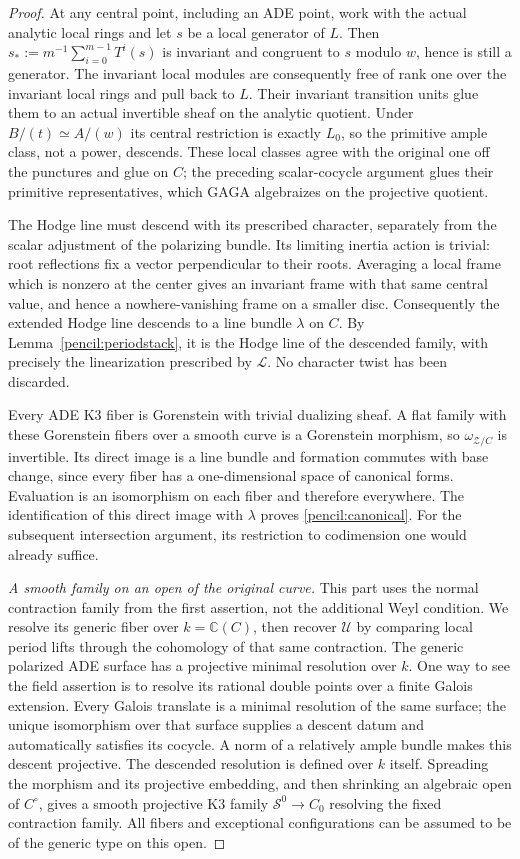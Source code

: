 \documentclass[11pt]{amsart}
\newcommand{\C}{\mathbb C}
\theoremstyle{definition}
\theoremstyle{remark}
\numberwithin{equation}{section}
\begin{document}
\begin{proof}
At any central point, including an ADE point, work with the actual
analytic local rings and let \(s\) be a local generator of \(L\).  Then
\(s_*:=m^{-1}\sum_{i=0}^{m-1}T^i(s)\) is invariant and congruent to
\(s\) modulo \(w\), hence is still a generator.  The invariant local
modules are consequently free of rank one over the invariant local
rings and pull back to \(L\).  Their invariant transition units glue
them to an actual invertible sheaf on the analytic quotient.  Under
\(B/(t)\simeq A/(w)\) its central restriction is exactly \(L_0\), so
the primitive ample class, not a power, descends.  These local classes
agree with the original one off the punctures and glue on \(C\); the
preceding scalar-cocycle argument glues their primitive representatives,
which GAGA algebraizes on the projective quotient.

The Hodge line must descend with its prescribed character, separately
from the scalar adjustment of the polarizing bundle.  Its limiting
inertia action is trivial: root reflections
fix a vector perpendicular to their roots.  Averaging a local frame
which is nonzero at the center gives an invariant frame with that
same central value, and hence a nowhere-vanishing frame on a smaller
disc.  Consequently
the extended Hodge line descends to a line bundle \(\lambda\) on \(C\).
By Lemma~\ref{pencil:periodstack}, it is the Hodge line of the descended
family, with precisely the linearization prescribed by \(\mathcal L\).
No character twist has been discarded.

Every ADE K3 fiber is Gorenstein with trivial dualizing sheaf.  A flat
family with these Gorenstein fibers over a smooth curve is a Gorenstein
morphism, so \(\omega_{\mathcal Z/C}\) is invertible.  Its direct image
is a line bundle and formation commutes with base change, since every
fiber has a one-dimensional space of canonical forms.  Evaluation is
an isomorphism on each fiber and therefore everywhere.  The identification
of this direct image with \(\lambda\) proves \eqref{pencil:canonical}.
For the subsequent intersection argument, its restriction to codimension
one would already suffice.

\emph{A smooth family on an open of the original curve.}
This part uses the normal contraction family from the first assertion,
not the additional Weyl condition.  We resolve its generic fiber over
\(k=\C(C)\), then recover \(\mathcal U\) by comparing local period
lifts through the cohomology of that same contraction.
The generic polarized ADE surface has a projective
minimal resolution over \(k\).  One way to see the field assertion is
to resolve its rational double points over a finite Galois extension.
Every Galois translate is a minimal resolution of the same surface;
the unique isomorphism over that surface supplies a descent datum and
automatically satisfies its cocycle.  A norm of a relatively ample
bundle makes this descent projective.  The descended resolution is
defined over \(k\) itself.  Spreading the morphism and its projective
embedding, and then shrinking an algebraic open of \(C^\circ\), gives
a smooth projective K3 family
\(\mathcal S^0\to C_0\) resolving the fixed contraction family.  All
fibers and exceptional configurations can be assumed to be of the
generic type on this open.


\end{proof}
\end{document}
